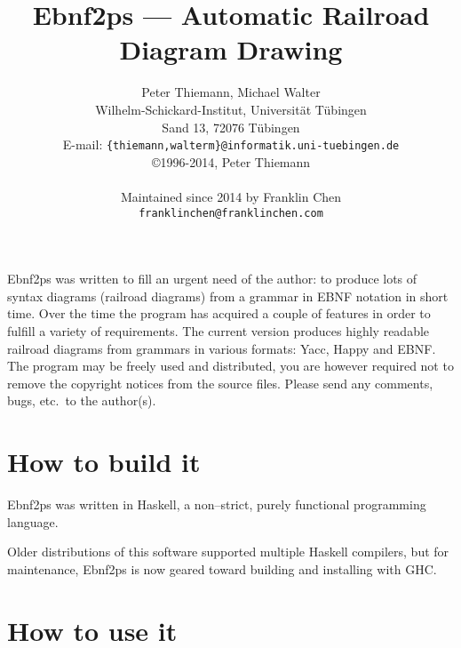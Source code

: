 \documentclass{article}
\begin{document}
\title{Ebnf2ps --- Automatic Railroad Diagram Drawing}
\author{
  Peter Thiemann, Michael Walter\\
  Wilhelm-Schickard-Institut, Universität Tübingen\\
  Sand 13, 72076 Tübingen\\
  E-mail: \texttt{\{thiemann,walterm\}@informatik.uni-tuebingen.de} \\
  \copyright 1996-2014, Peter Thiemann\\
  \\
  Maintained since 2014 by Franklin Chen\\
  \texttt{franklinchen@franklinchen.com}}
\maketitle

Ebnf2ps  was written to fill an urgent need of the author: to produce lots of
syntax diagrams (railroad diagrams) from a grammar in EBNF notation in short
time. Over the time the program has acquired a couple of features in order to
fulfill a variety of requirements. The current version produces highly readable
railroad diagrams from grammars in various formats: Yacc, Happy and
EBNF. \\
The program may be freely used and distributed, you are however required not to
remove the copyright notices from the source files. Please send any comments,
bugs, etc.\ to the author(s).



\section{How to build it}

Ebnf2ps was written in Haskell, a non--strict, purely functional
programming language.

Older distributions of this software supported multiple Haskell compilers, but
for maintenance, Ebnf2ps is now geared toward building and installing with GHC.

\section{How to use it}
\end{document}
